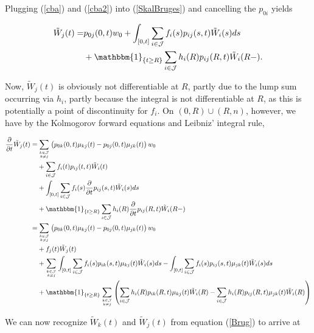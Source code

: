 \documentclass{article}
\newcommand{\1}[1]{\mathbbm{1}_{\left\lbrace #1 \right\rbrace}}
\theoremstyle{break}
\theoremstyle{remark}
\numberwithin{equation}{section}
\begin{document}
Plugging (\ref{cba}) and (\ref{cba2}) into (\ref{SkalBruges}) and cancelling the $p_{0i}$ yields

\begin{align} \label{Brug}
\begin{split}
		\tilde{W}_j(t) =& p_{0j}(0,t) w_0 + \int_{\left[ 0,t \right]} \sum_{i \in \mathcal{J}} f_{i}(s) p_{ij}(s,t) \tilde{W}_i(s) ds \\
	&+ \1{t \geq R} \sum_{i \in \mathcal{J}} h_{i}(R) p_{ij}(R,t) \tilde{W}_i(R-).
\end{split}
\end{align}

Now, $\tilde{W}_j(t)$ is obviously not differentiable at $R$, partly due to the lump sum occurring via $h_i$, partly because the integral is not differentiable at $R$, as this is potentially a point of discontinuity for $f_i$. On $(0,R)\cup(R,n)$, however, we have by the Kolmogorov forward equations and Leibniz' integral rule,

\begin{align*}
	\frac{\partial}{\partial t} \tilde{W}_j(t) =&\sum_{k \in \mathcal{J} \atop k \neq j} \left(p_{0k}(0,t) \mu_{kj}(t) - p_{0j}(0,t) \mu_{jk}(t) \right) w_0 \\
	&+ \sum_{i \in \mathcal{J}} f_i(t) p_{ij}(t,t) \tilde{W}_i(t) \\
	&+ \int_{\left[ 0,t \right]} \sum_{i \in \mathcal{J}} f_{i}(s) \frac{\partial}{\partial t} p_{ij}(s,t) \tilde{W}_i(s) ds \\
	&+ \1{t \geq R} \sum_{i \in \mathcal{J}} h_{i}(R) \frac{\partial}{\partial t} p_{ij}(R,t) \tilde{W}_i(R-) \\
	=& \sum_{k \in \mathcal{J} \atop k \neq j} \left(p_{0k}(0,t) \mu_{kj}(t) - p_{0j}(0,t) \mu_{jk}(t) \right) w_0 \\
	&+ f_j(t) \tilde{W}_j(t) \\
	&+ \sum_{k \in \mathcal{J} \atop k \neq j} \int_{\left[ 0,t \right]} \sum_{i \in \mathcal{J}} f_{i}(s) p_{ik}(s,t) \mu_{kj}(t) \tilde{W}_i(s) ds - \int_{\left[ 0,t \right]} \sum_{i \in \mathcal{J}} f_{i}(s) p_{ij}(s,t) \mu_{jk}(t) \tilde{W}_i(s) ds \\
	&+ \1{t \geq R} \sum_{k \in \mathcal{J} \atop k \neq j} \left( \sum_{i \in \mathcal{J}} h_{i}(R) p_{ik}(R,t) \mu_{kj}(t) \tilde{W}_i(R) - \sum_{i \in \mathcal{J}} h_{i}(R) p_{ij}(R,t) \mu_{jk}(t) \tilde{W}_i(R) \right) \\
\end{align*}

We can now recognize $\tilde{W}_k(t)$ and $\tilde{W}_j(t)$ from equation (\ref{Brug}) to arrive at
\end{document}
